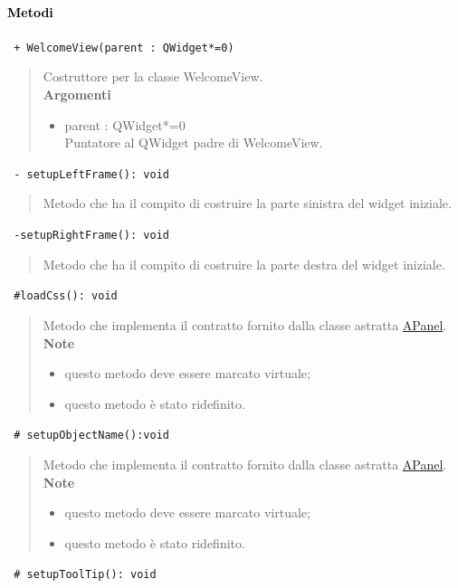 \paragraph{\textcolor{black}{Metodi\\}}
\color{blue}\verb! + WelcomeView(parent : QWidget*=0)!
\begin{quote}
\color{black}Costruttore per la classe WelcomeView. \\
\textbf{Argomenti}
\begin{itemize}
\item parent : QWidget*=0 \\ Puntatore al QWidget padre di WelcomeView.
\end{itemize}
\end{quote}
\color{blue}\verb! - setupLeftFrame(): void!
\begin{quote}
\color{black} Metodo che ha il compito di costruire la parte sinistra del widget iniziale.
\end{quote} 
\color{blue}\verb! -setupRightFrame(): void !
\begin{quote}
\color{black} Metodo che ha il compito di costruire la parte destra del widget iniziale.
\end{quote}  
\color{blue}\verb! #loadCss(): void !
\begin{quote}
\color{black} Metodo che implementa il contratto fornito dalla classe astratta \hyperref[speAPanel]{APanel}.\\
 \textbf{Note}
 \begin{itemize}
  \item questo metodo deve essere marcato virtuale;
 \item questo metodo è stato ridefinito.
 \end{itemize}
\end{quote} 
\color{blue}\verb! # setupObjectName():void!
\begin{quote}
\color{black} Metodo che implementa il contratto fornito dalla classe astratta \hyperref[speAPanel]{APanel}.\\
 \textbf{Note}
 \begin{itemize}
  \item questo metodo deve essere marcato virtuale;
 \item questo metodo è stato ridefinito.
 \end{itemize}
\end{quote} 
\color{blue}\verb! # setupToolTip(): void!
